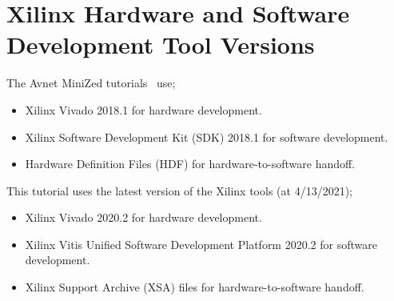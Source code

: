 \section{Xilinx Hardware and Software Development Tool Versions}

The Avnet MiniZed tutorials~\cite{Avnet_MiniZed_Tutorial01_2018,
Avnet_MiniZed_Tutorial02_2018,Avnet_MiniZed_Tutorial03_2018,
Avnet_MiniZed_Tutorial04_2018,Avnet_MiniZed_Tutorial05_2018,
Avnet_MiniZed_Tutorial06_2018,Avnet_MiniZed_Tutorial07_2018,
Avnet_MiniZed_Tutorial08_2018} use;
%
\begin{itemize}
\item Xilinx Vivado 2018.1 for hardware development.
\item Xilinx Software Development Kit (SDK) 2018.1 for software development.
\item Hardware Definition Files (HDF) for hardware-to-software handoff.
\end{itemize}
%
This tutorial uses the latest version of the Xilinx tools (at 4/13/2021);
%
\begin{itemize}
\item Xilinx Vivado 2020.2 for hardware development.
\item Xilinx Vitis Unified Software Development Platform 2020.2 for software development.
\item Xilinx Support Archive (XSA) files for hardware-to-software handoff.
\end{itemize}
%

